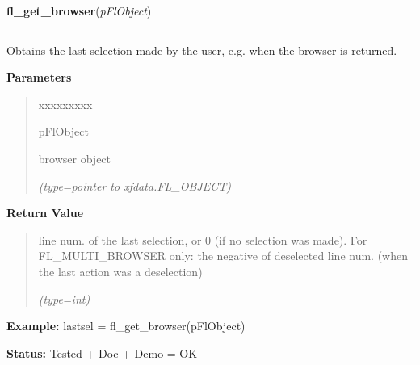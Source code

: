 \hspace{.8\funcindent}\begin{boxedminipage}{\funcwidth}

    \raggedright \textbf{fl\_get\_browser}(\textit{pFlObject})

    \vspace{-1.5ex}

    \rule{\textwidth}{0.5\fboxrule}
\setlength{\parskip}{2ex}
    Obtains the last selection made by the user, e.g. when the browser is 
    returned.

\setlength{\parskip}{1ex}
      \textbf{Parameters}
      \vspace{-1ex}

      \begin{quote}
        \begin{Ventry}{xxxxxxxxx}

          \item[pFlObject]

          browser object

            {\it (type=pointer to xfdata.FL\_OBJECT)}

        \end{Ventry}

      \end{quote}

      \textbf{Return Value}
    \vspace{-1ex}

      \begin{quote}
      line num. of the last selection, or 0 (if no selection was made). For
      FL\_MULTI\_BROWSER only: the negative of deselected line num. (when 
      the last action was a deselection)

      {\it (type=int)}

      \end{quote}

\textbf{Example:} lastsel = fl\_get\_browser(pFlObject)



\textbf{Status:} Tested + Doc + Demo = OK



    \end{boxedminipage}

    \label{xformslib:flbrowser:fl_get_browser_maxline}

    \vspace{0.5ex}

